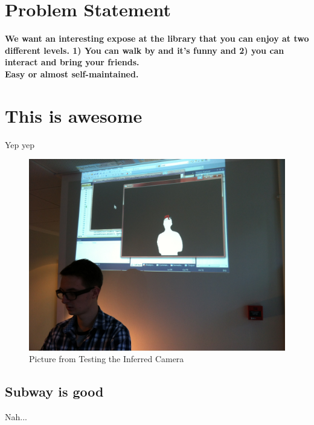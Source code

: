 \section{Problem Statement}
      
\textbf{We want an interesting expose at the library that you can enjoy at two different levels. 1) You can walk by and it's funny and 2) you can interact and bring your friends.}\\
\textbf{Easy or almost self-maintained.}

\section{This is awesome}
Yep yep

\begin{figure}[htbp]
\centering
\includegraphics[width=1.00\textwidth]{Pictures/Test/IMG_1477.jpg}
\caption{Picture from Testing the Inferred Camera}
\label{fig:Picture from Testing the Inferred Camera}
\end{figure}

\subsection{Subway is good}
Nah...
